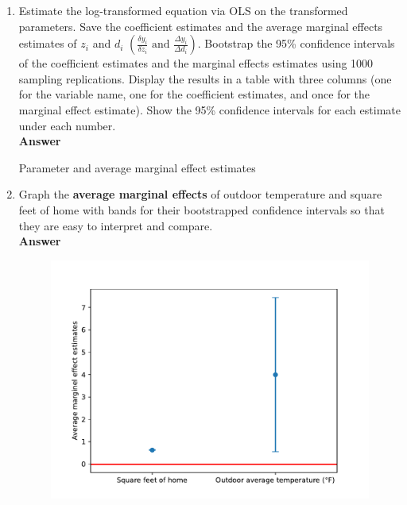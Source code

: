 \documentclass{article}
\begin{document}
\begin{enumerate}
\begin{enumerate}
    \item Estimate the log-transformed equation via OLS on the transformed parameters. Save the coefficient estimates and the average marginal effects estimates of $z_i$ and $d_i$ $\left(\frac{\delta y_i}{\delta z_i}\text{ and }\frac{\Delta y_i}{\Delta d_i}\right)$. Bootstrap the 95\% confidence intervals of the coefficient estimates and the marginal effects estimates using 1000 sampling replications. Display the results in a table with three columns (one for the variable name, one for the coefficient estimates, and once for the marginal effect estimate). Show the 95\% confidence intervals for each estimate under each number.
    \\\textbf{Answer}\\
    \begin{table}[H]\centering
        \begin{threeparttable}
            \caption{Parameter and average marginal effect estimates}
            \label{t1:estimates}
            
        \end{threeparttable}
        \end{table}
    \item Graph the \textbf{average marginal effects} of outdoor temperature and square feet of home with bands for their bootstrapped confidence intervals so that they are easy to interpret and compare.
    \\\textbf{Answer}\\
    \begin{figure}[H]
        \centering
        \includegraphics[scale = 0.7]{./figure/ame.pdf}

\end{figure}
\end{enumerate}
\end{enumerate}
\end{document}

